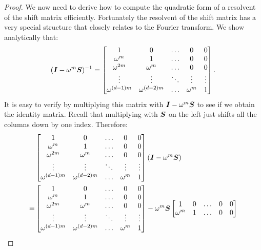 \begin{proof}
We now need to derive how to compute the quadratic form of a resolvent of the
shift matrix efficiently.
Fortunately the resolvent of the shift matrix has a very special structure that
closely relates to the Fourier transform.
We show analytically that:
\begin{equation*}
  (\boldsymbol{I} - \omega^m \boldsymbol{S})^{-1} = \begin{bmatrix}
    1 & 0 & \dots & 0 & 0 \\
    \omega^m & 1 & \dots & 0 & 0 \\
    \omega^{2m} & \omega^{m} & \dots & 0 & 0 \\
    \vdots & \vdots & \ddots & \vdots & \vdots \\
    \omega^{(d-1)m} & \omega^{(d-2)m} & \dots & \omega^m & 1 \\
  \end{bmatrix}.
\end{equation*}
It is easy to verify by multiplying this matrix with $\boldsymbol{I} - \omega^m \boldsymbol{S}$ to see if
we obtain the identity matrix. Recall that multiplying with $\boldsymbol{S}$ on the left
just shifts all the columns down by one index.
Therefore:
\begin{align*}
  & \begin{bmatrix}
    1 & 0 & \dots & 0 & 0 \\
    \omega^m & 1 & \dots & 0 & 0 \\
    \omega^{2m} & \omega^{m} & \dots & 0 & 0 \\
    \vdots & \vdots & \ddots & \vdots & \vdots \\
    \omega^{(d-1)m} & \omega^{(d-2)m} & \dots & \omega^m & 1 \\
  \end{bmatrix}
  (\boldsymbol{I} - \omega^m \boldsymbol{S}) \\
    =&   \begin{bmatrix}
         1 & 0 & \dots & 0 & 0 \\
         \omega^m & 1 & \dots & 0 & 0 \\
         \omega^{2m} & \omega^{m} & \dots & 0 & 0 \\
         \vdots & \vdots & \ddots & \vdots & \vdots \\
         \omega^{(d-1)m} & \omega^{(d-2)m} & \dots & \omega^m & 1 \\
       \end{bmatrix}
    - \omega^m
  \boldsymbol{S} \begin{bmatrix}
         1 & 0 & \dots & 0 & 0 \\
         \omega^m & 1 & \dots & 0 & 0 \\

\end{bmatrix}
\end{align*}
\end{proof}
